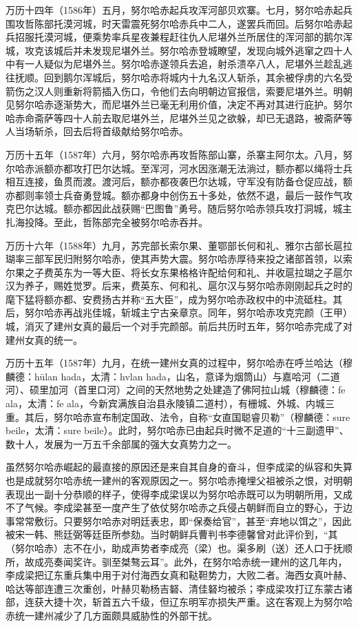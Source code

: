 万历十四年（1586年）五月，努尔哈赤起兵攻浑河部贝欢寨。七月，努尔哈赤起兵围攻哲陈部托漠河城，时天雷震死努尔哈赤兵中二人，遂罢兵而回。后努尔哈赤起兵招服托漠河城，便乘势率兵星夜兼程赶往仇人尼堪外兰所居住的浑河部的鹅尔浑城，攻克该城后并未发现尼堪外兰。努尔哈赤登城瞭望，发现向城外逃窜之四十人中有一人疑似为尼堪外兰。努尔哈赤遂领兵去追，射杀溃卒八人，尼堪外兰趁乱逃往抚顺。回到鹅尔浑城后，努尔哈赤将城内十九名汉人斩杀，其余被俘虏的六名受箭伤之汉人则重新将箭插入伤口，令他们去向明朝边官报信，索要尼堪外兰。明朝见努尔哈赤逐渐势大，而尼堪外兰已毫无利用价值，决定不再对其进行庇护。努尔哈赤命斋萨等四十人前去取尼堪外兰，尼堪外兰见之欲躲，却已无退路，被斋萨等人当场斩杀，回去后将首级献给努尔哈赤。

万历十五年（1587年）六月，努尔哈赤再攻哲陈部山寨，杀寨主阿尔太。八月，努尔哈赤派额亦都攻打巴尔达城。至浑河，河水因涨潮无法淌过，额亦都以绳将士兵相互连接，鱼贯而渡。渡河后，额亦都夜袭巴尔达城，守军没有防备仓促应战，额亦都则率领士兵奋勇登城。额亦都身中创伤五十多处，依然不退，最后一鼓作气攻克巴尔达城。额亦都因此战获赐“巴图鲁”勇号。随后努尔哈赤领兵攻打洞城，城主扎海投降。至此，哲陈部完全被努尔哈赤吞并。

万历十六年（1588年）九月，苏完部长索尔果、董鄂部长何和礼、雅尔古部长扈拉瑚率三部军民归附努尔哈赤，使其声势大震。努尔哈赤厚待来投之诸部首领，以索尔果之子费英东为一等大臣、将长女东果格格许配给何和礼、并收扈拉瑚之子扈尔汉为养子，赐姓觉罗。后来，费英东、何和礼、扈尔汉与努尔哈赤刚刚起兵之时的麾下猛将额亦都、安费扬古并称“五大臣”，成为努尔哈赤政权中的中流砥柱。其后，努尔哈赤再战兆佳城，斩城主宁古亲章京。同年，努尔哈赤攻克完颜（王甲）城，消灭了建州女真的最后一个对手完颜部。前后共历时五年，努尔哈赤完成了对建州女真的统一。

万历十五年（1587年）九月，在统一建州女真的过程中，努尔哈赤在呼兰哈达（穆麟德：hūlan hada，太清：hvlan hada，山名，意译为烟筒山）与嘉哈河（二道河）、硕里加河（首里口河）之间的天然地势之处建造了佛阿拉山城（穆麟德：fe ala，太清：fe ala，今新宾满族自治县永陵镇二道村），有栅城、外城、内城三重。其后，努尔哈赤宣布制定国政、法令，自称“女直国聪睿贝勒”（穆麟德：sure beile，太清：sure beile）。此时，努尔哈赤已由起兵时微不足道的“十三副遗甲”、数十人，发展为一万五千余部属的强大女真势力之一。

虽然努尔哈赤崛起的最直接的原因还是来自其自身的奋斗，但李成梁的纵容和失算也是成就努尔哈赤统一建州的客观原因之一。努尔哈赤掩埋父祖被杀之恨，对明朝表现出一副十分恭顺的样子，使得李成梁误以为努尔哈赤既可以为明朝所用，又成不了气候。李成梁甚至一度产生了依仗努尔哈赤之兵侵占朝鲜而自立的野心，于边事常常敷衍。只要努尔哈赤对明廷表忠，即“保奏给官”，甚至“弃地以饵之”，因此被宋一韩、熊廷弼等廷臣所参劾。当时朝鲜兵曹判书李德馨曾对此评价到，“其（努尔哈赤）志不在小，助成声势者李成亮（梁）也。渠多刷（送）还人口于抚顺所，故成亮奏闻奖许。驯至桀骜云耳”。此外，在努尔哈赤统一建州的这几年内，李成梁把辽东重兵集中用于对付海西女真和鞑靼势力，大败二者。海西女真叶赫、哈达等部连遭三次重创，叶赫贝勒杨吉砮、清佳砮均被杀；李成梁攻打辽东蒙古诸部，连获大捷十次，斩首五六千级，但辽东明军亦损失严重。这在客观上为努尔哈赤统一建州减少了几方面颇具威胁性的外部干扰。

